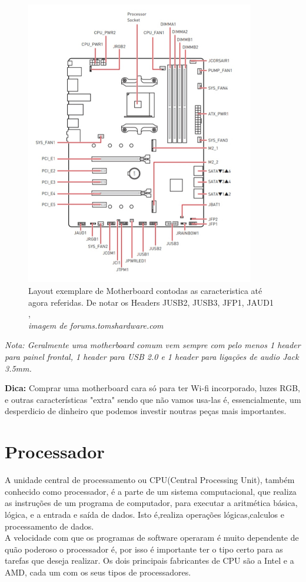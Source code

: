 \begin{enumerate}
	\begin{figure}[H]
		\centering
		\includegraphics[width=10cm]{./layoutMB.jpeg}
		\caption{Layout exemplare de Motherboard contodas as caracteristica até agora referidas. De notar os Headers JUSB2, JUSB3, JFP1, JAUD1 , \\ \textsl{imagem de forums.tomshardware.com}}
		\label{fig.cabeçasparafusos}
	\end{figure} 
	
\textsl{Nota: Geralmente uma motherboard comum vem sempre com pelo menos 1 header para painel frontal, 1 header para USB 2.0 e 1 header para ligações de audio Jack 3.5mm.}
\end{enumerate}

	\textbf{Dica:} Comprar uma motherboard cara só para ter Wi-fi incorporado, luzes RGB, e outras características "extra" sendo que não vamos usa-las é, essencialmente, um desperdicio de dinheiro que podemos investir noutras peças mais importantes.
	
\chapter{Processador}
\label{chap.cpu}
A unidade central de processamento ou CPU(Central Processing Unit), também conhecido como processador, é a parte de um sistema computacional, que realiza as instruções de um programa de computador, para executar a aritmética básica, lógica, e a entrada e saída de dados. Isto é,realiza operações lógicas,calculos e processamento de dados.\\
A velocidade com que os programas de software operaram é muito dependente de quão poderoso o processador é, por isso é importante ter o tipo certo para as tarefas que deseja realizar. Os dois principais fabricantes de CPU são a Intel e a AMD, cada um com os seus tipos de processadores.\\

